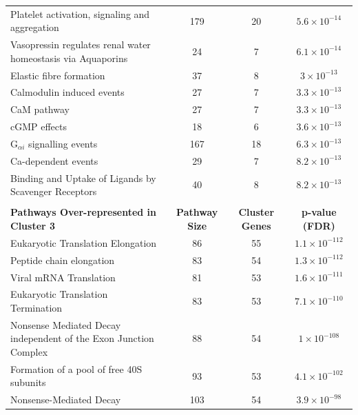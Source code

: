 \begin{table}[!hp]
{\begin{tabular}{lccc}
  \rowcolor{Cluster_Green!15} 
  Platelet activation, signaling and aggregation & 179 &  20 & $5.6 \times 10^{-14}$ \\ 
  \rowcolor{Cluster_Green!20} 
  Vasopressin regulates renal water homeostasis via Aquaporins &  24 &   7 & $6.1 \times 10^{-14}$ \\ 
  \rowcolor{Cluster_Green!15} 
  Elastic fibre formation &  37 &   8 & $3 \times 10^{-13}$ \\ 
  \rowcolor{Cluster_Green!20} 
  Calmodulin induced events &  27 &   7 & $3.3 \times 10^{-13}$ \\ 
  \rowcolor{Cluster_Green!15} 
  CaM pathway &  27 &   7 & $3.3 \times 10^{-13}$ \\ 
  \rowcolor{Cluster_Green!20} 
  cGMP effects &  18 &   6 & $3.6 \times 10^{-13}$ \\ 
  \rowcolor{Cluster_Green!15} 
  G$_{\alpha i}$ signalling events & 167 &  18 & $6.3 \times 10^{-13}$ \\ 
  \rowcolor{Cluster_Green!20} 
  Ca-dependent events &  29 &   7 & $8.2 \times 10^{-13}$ \\ 
  \rowcolor{Cluster_Green!15} 
  Binding and Uptake of Ligands by Scavenger Receptors &  40 &   8 & $8.2 \times 10^{-13}$ \\ 
  \hline
  \\
  \cellcolor{white} \large{\textbf{Pathways Over-represented in Cluster 3}} & \large{\textbf{Pathway Size}} & \large{\textbf{Cluster Genes}} & \large{\textbf{p-value (FDR)}} \\ %
  \hline
  \rowcolor{Cluster_Orange!30}
  Eukaryotic Translation Elongation &  86 &  55 & $1.1 \times 10^{-112}$ \\ 
  \rowcolor{Cluster_Orange!20} 
  Peptide chain elongation &  83 &  54 & $1.3 \times 10^{-112}$ \\ 
  \rowcolor{Cluster_Orange!30} 
  Viral mRNA Translation &  81 &  53 & $1.6 \times 10^{-111}$ \\ 
  \rowcolor{Cluster_Orange!20} 
  Eukaryotic Translation Termination &  83 &  53 & $7.1 \times 10^{-110}$ \\ 
  \rowcolor{Cluster_Orange!30} 
  Nonsense Mediated Decay independent of the Exon Junction Complex &  88 &  54 & $1 \times 10^{-108}$ \\ 
  \rowcolor{Cluster_Orange!20} 
  Formation of a pool of free 40S subunits &  93 &  53 & $4.1 \times 10^{-102}$ \\ 
  \rowcolor{Cluster_Orange!30} 
  Nonsense-Mediated Decay & 103 &  54 & $3.9 \times 10^{-98}$ \\ 

\end{tabular}}
\end{table}
